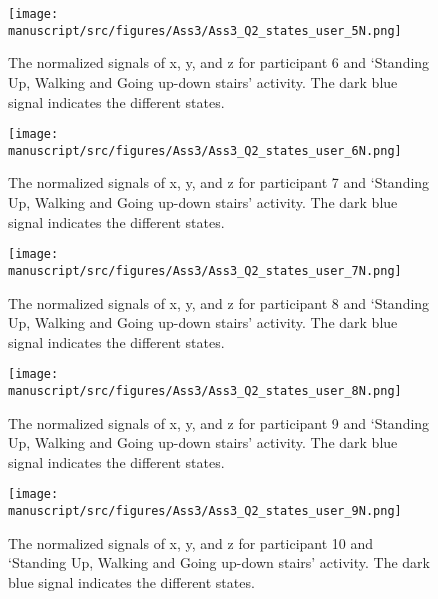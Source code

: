 \begin{figure}[H]
    \centering
    \begin{minipage}[b]{1\textwidth}
        \texttt{[image: manuscript/src/figures/Ass3/Ass3\_Q2\_states\_user\_5N.png]}
    \end{minipage}
    \caption{The normalized signals of x, y, and z for participant 6 and ‘Standing  Up,  Walking  and  Going  up-down  stairs’ activity. The dark blue signal indicates the different states.}
    \label{fig:Ass3_Q2_states_user_5N}
\end{figure}
\begin{figure}[H]
    \centering
    \begin{minipage}[b]{1\textwidth}
        \texttt{[image: manuscript/src/figures/Ass3/Ass3\_Q2\_states\_user\_6N.png]}
    \end{minipage}
    \caption{The normalized signals of x, y, and z for participant 7 and ‘Standing  Up,  Walking  and  Going  up-down  stairs’ activity. The dark blue signal indicates the different states.}
    \label{fig:Ass3_Q2_states_user_6N}
\end{figure}
\begin{figure}[H]
    \centering
    \begin{minipage}[b]{1\textwidth}
        \texttt{[image: manuscript/src/figures/Ass3/Ass3\_Q2\_states\_user\_7N.png]}
    \end{minipage}
    \caption{The normalized signals of x, y, and z for participant 8 and ‘Standing  Up,  Walking  and  Going  up-down  stairs’ activity. The dark blue signal indicates the different states.}
    \label{fig:Ass3_Q2_states_user_7N}
\end{figure}
\begin{figure}[H]
    \centering
    \begin{minipage}[b]{1\textwidth}
        \texttt{[image: manuscript/src/figures/Ass3/Ass3\_Q2\_states\_user\_8N.png]}
    \end{minipage}
    \caption{The normalized signals of x, y, and z for participant 9 and ‘Standing  Up,  Walking  and  Going  up-down  stairs’ activity. The dark blue signal indicates the different states.}
    \label{fig:Ass3_Q2_states_user_8N}
\end{figure}
\begin{figure}[H]
    \centering
    \begin{minipage}[b]{1\textwidth}
        \texttt{[image: manuscript/src/figures/Ass3/Ass3\_Q2\_states\_user\_9N.png]}
    \end{minipage}
    \caption{The normalized signals of x, y, and z for participant 10 and ‘Standing  Up,  Walking  and  Going  up-down  stairs’ activity. The dark blue signal indicates the different states.}
    \label{fig:Ass3_Q2_states_user_9N}
\end{figure}
